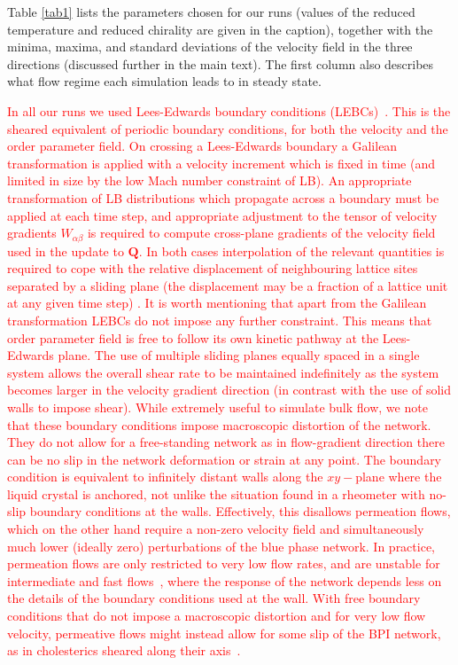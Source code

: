 \documentclass[8.5pt,twoside,twocolumn]{article}
\newcommand{\rev}[1]{{\textcolor{red}{#1}}}
\begin{document}
\clearpage
Table \ref{tab1} lists the parameters chosen for our runs (values of
the reduced temperature and reduced chirality are given in the caption),
together with the minima, maxima, and standard deviations of the velocity
field in the three directions (discussed further in the main text). 
The first column also describes what flow regime each simulation
leads to in steady state.

\rev{
In all our runs we used Lees-Edwards boundary conditions (LEBCs)~\cite{Wagner:2002}.
This is the sheared equivalent of periodic boundary conditions, for both the 
velocity and the order parameter field. 
On crossing a Lees-Edwards boundary a Galilean transformation is applied
with a velocity increment which is fixed in time (and limited in size by the
low Mach number constraint of LB). An appropriate transformation
of LB distributions which propagate across a boundary
must be applied at each time step, and appropriate
adjustment to the tensor of velocity gradients $W_{\alpha\beta}$ 
is required to compute cross-plane gradients of the velocity field 
used in the update to ${\mathbf Q}$. In both cases interpolation of the
relevant quantities is required to cope with the relative displacement
of neighbouring lattice sites separated by a sliding plane (the
displacement may be a fraction of a lattice unit at any given time
step) \cite{Henrich:2012a}. It is worth mentioning that apart from 
the Galilean transformation LEBCs do not impose any further constraint.
This means that order parameter field is free to follow its own kinetic pathway
at the Lees-Edwards plane. 
The use of multiple sliding planes equally spaced in a single
system allows the overall shear rate to be maintained indefinitely as the system
becomes larger in the velocity gradient direction (in contrast with the use of solid
walls to impose shear).
While extremely useful to simulate bulk flow, we
note that these boundary conditions impose macroscopic distortion
of the network. They do not allow for a free-standing network as
in flow-gradient direction there can be no slip in the network deformation 
or strain at any point.
The boundary condition is equivalent to infinitely distant
walls along the $xy-$plane where the liquid crystal is anchored,
not unlike the situation found in a rheometer with no-slip
boundary conditions at the walls.
Effectively, this disallows permeation flows, which on the other
hand require a non-zero velocity field and simultaneously
much lower (ideally zero) perturbations of the blue phase network.
In practice, permeation flows are 
only restricted to very low flow rates, and are unstable for intermediate 
and fast flows~\cite{Dupuis:2005}, 
where the response of the network depends less on
the details of the boundary conditions used at the wall.
With free boundary conditions that do not impose a macroscopic distortion 
and for very low flow velocity, 
permeative flows might instead allow for
some slip of the BPI network, as in cholesterics sheared
along their axis~\cite{Marenduzzo:2006a, Marenduzzo:2006b}.
}


\footnotesize{
}
\end{document}
